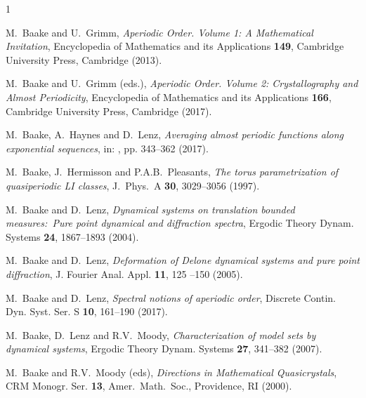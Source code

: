 \documentclass[11pt, a4wide]{amsart}
\numberwithin{lemma}{section}
\begin{document}
\begin{thebibliography}{1}




{M.~Baake and U.~Grimm, \textit{Aperiodic Order. Volume 1: A Mathematical Invitation},
Encyclopedia of Mathematics and its Applications \textbf{149}, Cambridge University Press, Cambridge (2013).}

{M.~Baake and U.~Grimm (eds.),
\textit{Aperiodic Order. Volume 2: Crystallography and Almost Periodicity},
Encyclopedia of Mathematics and its Applications \textbf{166}, Cambridge University Press, Cambridge (2017).}

M.~Baake, A.~Haynes and D.~Lenz,
\textit{Averaging almost periodic functions along exponential sequences},  in: \cite{BG3}, pp. 343--362 (2017).

{M.~Baake, J.~Hermisson and P.A.B.~Pleasants,
\textit{The torus parametrization of quasiperiodic LI classes},
J.\ Phys.\ A {\bf 30}, 3029--3056 (1997).}

{M.~Baake and D.~Lenz,
\textit{Dynamical systems on translation bounded measures:\
Pure point dynamical and diffraction spectra},
Ergodic Theory Dynam. Systems \textbf{24}, 1867--1893 (2004).}

{M.~Baake and D.~Lenz,
\textit{Deformation of Delone dynamical systems and pure point diffraction},
 J. Fourier Anal. Appl. \textbf{11}, 125 --150 (2005).}

{M.~Baake and D.~Lenz,
\textit{Spectral notions of aperiodic order},
Discrete Contin. Dyn. Syst. Ser. S \textbf{10}, 161--190 (2017).}

{M.~Baake, D.~Lenz and R.V.~Moody,
\textit{Characterization of model sets by dynamical systems},
Ergodic Theory Dynam. Systems \textbf{27}, 341--382 (2007).}

{M.~Baake and R.V.~Moody (eds), \textit{Directions in Mathematical Quasicrystals},
 CRM Monogr. Ser. \textbf{13}, Amer.~Math.~Soc., Providence, RI (2000).}


\end{thebibliography}
\end{document}
